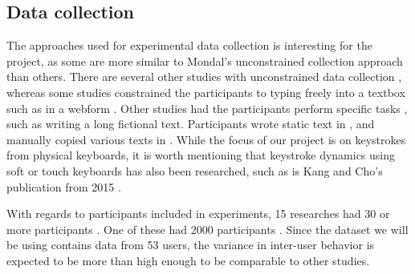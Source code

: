 \subsection{Data collection}
\label{sec:related-overview-collection}
The approaches used for experimental data collection is interesting for the project, as some are more similar to Mondal's \cite{mondal} unconstrained collection approach than others.
There are several other studies with unconstrained data collection \cite{Ahmed, BOURS201236, superResults, sliding, Janakiraman2007,  Pinto2014, chi-square, dowl, occ}, whereas some studies constrained the participants to typing freely into a textbox such as in a webform \cite{davoudi2009, davoudi2010, gnp, Solami, KANG201572, markov, meaningless}.
Other studies had the participants perform specific tasks \cite{monaco, Monrose,  park, 900words}, such as writing a long fictional text.
Participants wrote static text in \cite{hu, Kolakowska2011}, and manually copied various texts in \cite{meaningless, alsultan, KIM2017}.
While the focus of our project is on keystrokes from physical keyboards, it is worth mentioning that keystroke dynamics using soft or touch keyboards has also been researched, such as is Kang and Cho's publication from 2015 \cite{KANG201572}.

With regards to participants included in experiments, 15 researches had 30 or more participants \cite{Messerman, gnp, Ahmed, superResults, KIM2017, 900words, sliding, Monrose, park, monaco, KANG201572, dowl, cognition, meaningless, stewart}.
One of these had 2000 participants \cite{900words}.
Since the dataset we will be using \cite{mondal} contains data from 53 users, the variance in inter-user behavior is expected to be more than high enough to be comparable to other studies.

